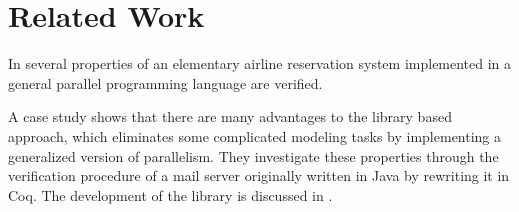 \chapter{Related Work}

In \cite{proving-parallel-assertions} several properties of an elementary airline reservation system implemented in a general parallel programming language are verified.

A case study \cite{coq-concurrent-verification-case-study} shows that there are many advantages to the library based approach, which eliminates some complicated modeling tasks by implementing a generalized version of parallelism. They investigate these properties through the verification procedure of a mail server originally written in Java by rewriting it in Coq. \cite{coq-mail-server}
The development of the library is discussed in \cite{AFFELDT200817}.